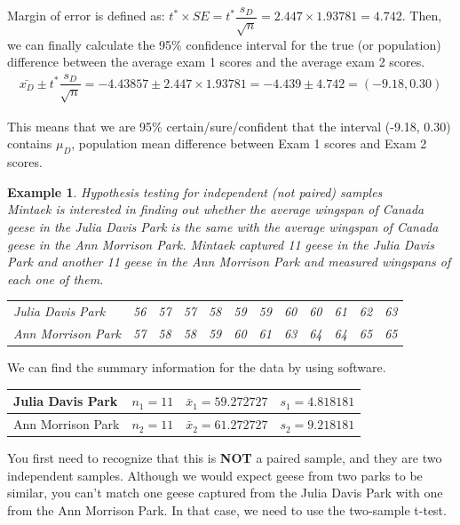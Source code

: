 \documentclass[12pt]{article}
\newcounter{lecnum}
\newtheorem{example}{Example}[lecnum]
\begin{document}
Margin of error is defined as: $t^* \times SE = t^* \dfrac{s_D}{\sqrt{n}} = 2.447 \times 1.93781 = 4.742$. Then, we can finally calculate the 95\% confidence interval for the true (or population) difference between the average exam 1 scores and the average exam 2 scores.
\begin{align*}
\bar{x_D} \pm t^* \dfrac{s_D}{\sqrt{n}} = -4.43857 \pm 2.447 \times 1.93781 = -4.439 \pm 4.742 = (-9.18, 0.30)
\end{align*}

This means that we are 95\% certain/sure/confident that the interval (-9.18, 0.30) contains $\mu_D$, population mean difference between Exam 1 scores and Exam 2 scores.

\pagebreak

\begin{example} Hypothesis testing for independent (not paired) samples \\
	Mintaek is interested in finding out whether the average wingspan of Canada geese in the Julia Davis Park is the same with the average wingspan of Canada geese in the Ann Morrison Park. Mintaek captured 11 geese in the Julia Davis Park and another 11 geese in the Ann Morrison Park and measured wingspans of each one of them.
	\begin{table}[!h]
		\centering
		\begin{tabular}{llllllllllll}
			Julia Davis Park & 56 & 57 & 57 & 58 & 59 & 59 & 60 & 60 & 61 & 62 & 63 \\
			Ann Morrison Park & 57 & 58 & 58 & 59 & 60 & 61 & 63 & 64 & 64 & 65 & 65
		\end{tabular}
	\end{table}
\end{example}

\vspace{-10mm}
We can find the summary information for the data by using software.
\begin{table}[!h]
	\centering
	\begin{tabular}{l|lll}
		Julia Davis Park  & $n_1 = 11$ & $\bar{x}_1 = 59.272727$ & $s_1 = 4.818181$ \\ \hline
		Ann Morrison Park & $n_2 = 11$ & $\bar{x}_2 = 61.272727$ & $s_2 = 9.218181$
	\end{tabular}
\end{table}

\vspace{-10pt}
You first need to recognize that this is \textbf{NOT} a paired sample, and they are two independent samples. Although we would expect geese from two parks to be similar, you can't match one geese captured from the Julia Davis Park with one from the Ann Morrison Park. In that case, we need to use the two-sample t-test.
\end{document}
